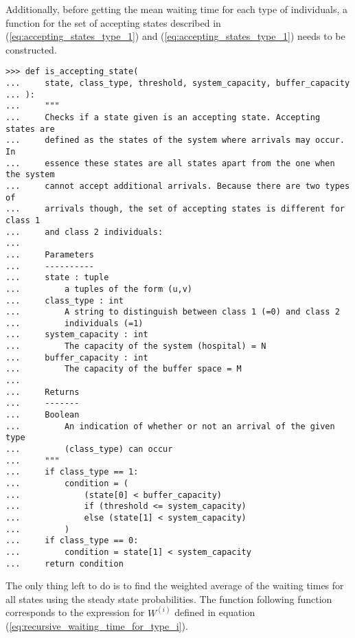 Additionally, before getting the mean waiting time for each type of individuals,
a function for the set of accepting states described in
(\ref{eq:accepting_states_type_1}) and (\ref{eq:accepting_states_type_1}) needs
to be constructed.

\begin{lstlisting}[style=pystyle]
>>> def is_accepting_state(
...     state, class_type, threshold, system_capacity, buffer_capacity
... ):
...     """
...     Checks if a state given is an accepting state. Accepting states are
...     defined as the states of the system where arrivals may occur. In
...     essence these states are all states apart from the one when the system
...     cannot accept additional arrivals. Because there are two types of
...     arrivals though, the set of accepting states is different for class 1
...     and class 2 individuals:
... 
...     Parameters
...     ----------
...     state : tuple
...         a tuples of the form (u,v)
...     class_type : int
...         A string to distinguish between class 1 (=0) and class 2
...         individuals (=1)
...     system_capacity : int
...         The capacity of the system (hospital) = N
...     buffer_capacity : int
...         The capacity of the buffer space = M
... 
...     Returns
...     -------
...     Boolean
...         An indication of whether or not an arrival of the given type
...         (class_type) can occur
...     """
...     if class_type == 1:
...         condition = (
...             (state[0] < buffer_capacity)
...             if (threshold <= system_capacity)
...             else (state[1] < system_capacity)
...         )
...     if class_type == 0:
...         condition = state[1] < system_capacity
...     return condition

\end{lstlisting}

The only thing left to do is to find the weighted average of the waiting times
for all states using the steady state probabilities.
The function following function corresponds to the expression for \(W^{(i)}\)
defined in equation (\ref{eq:recursive_waiting_time_for_type_i}).

